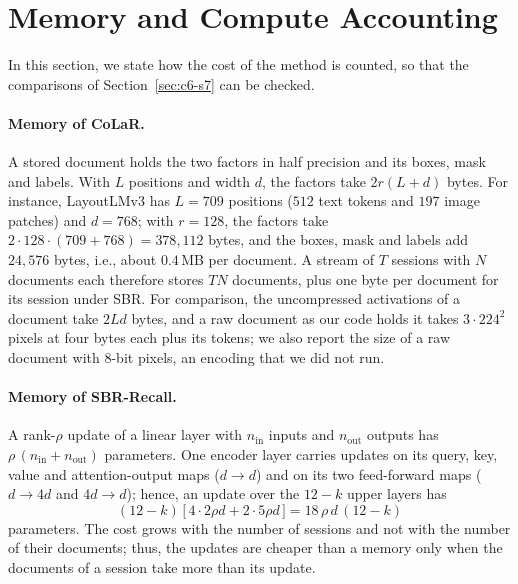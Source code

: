 \section{Memory and Compute Accounting}
\label{sec:m-accounting}

In this section, we state how the cost of the method is counted, so that the comparisons of
Section~\ref{sec:c6-s7} can be checked.

\paragraph{Memory of CoLaR.} A stored document holds the two factors in half precision and
its boxes, mask and labels. With $L$ positions and width $d$, the factors take $2r(L+d)$
bytes. For instance, LayoutLMv3 has $L=709$ positions ($512$ text tokens and $197$ image
patches) and $d=768$; with $r=128$, the factors take $2\cdot128\cdot(709+768)=378{,}112$
bytes, and the boxes, mask and labels add $24{,}576$ bytes, i.e., about $0.4$\,MB per
document. A stream of $T$ sessions with $N$ documents each therefore stores $TN$ documents,
plus one byte per document for its session under SBR. For comparison, the uncompressed
activations of a document take $2Ld$ bytes, and a raw document as our code holds it takes
$3\cdot224^{2}$ pixels at four bytes each plus its tokens; we also report the size of a raw
document with 8-bit pixels, an encoding that we did not run.

\paragraph{Memory of SBR-Recall.} A rank-$\rho$ update of a linear layer with $n_{\text{in}}$
inputs and $n_{\text{out}}$ outputs has $\rho\,(n_{\text{in}}+n_{\text{out}})$ parameters. One
encoder layer carries updates on its query, key, value and attention-output maps
($d\rightarrow d$) and on its two feed-forward maps ($d\rightarrow 4d$ and $4d\rightarrow
d$); hence, an update over the $12-k$ upper layers has
\begin{equation}
  (12-k)\,\big[\,4\cdot 2\rho d+2\cdot 5\rho d\,\big]=18\,\rho\,d\,(12-k)
  \label{eq:delta-params}
\end{equation}
parameters. The cost grows with the number of sessions and not with the number of their
documents; thus, the updates are cheaper than a memory only when the documents of a session
take more than its update.

